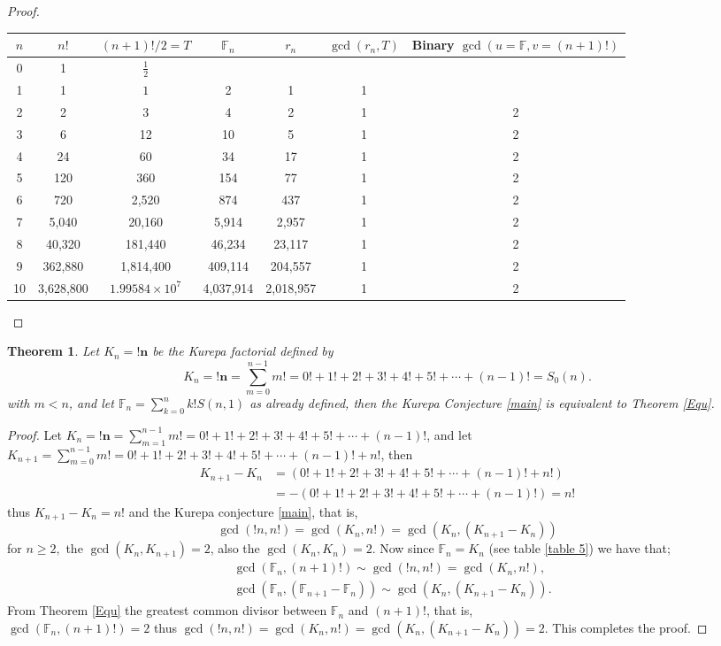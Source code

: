 \documentclass[pdflatex,sn-mathphys-num]{sn-jnl}%
\newtheorem{theorem}{Theorem}
\theoremstyle{thmstyleone}%
\theoremstyle{thmstyletwo}%
\theoremstyle{thmstylethree}%
\begin{document}
\begin{proof}
\begin{tabular}{ccccccc}
\toprule
$n$ & $n!$ & $(n+1)!/2=T$ & $\mathbb{F}_{n}$ &$r_n$ & $\gcd(r_{n},T)$& Binary $\gcd(u=\mathbb{F}, v=(n+1)!)$\\
\midrule
0 & 1 & $\frac{1}{2}$ &  &  & & \\
1 & 1 & $1$ & 2 &1 & 1& \\
2 & 2 & 3 & 4 &2 & 1&2\\
3 & 6 & 12 & 10 &5  & 1&2\\
4 & 24 & 60 & 34 &17  & 1& 2\\
5 & 120 & 360 &154  &77 & 1& 2\\
6 & 720 & 2,520 & 874 &437& 1& 2\\
7 & 5,040 & 20,160 & 5,914 &2,957& 1& 2\\
8 & 40,320 & 181,440 & 46,234 &23,117& 1& 2\\
9 & 362,880 & 1,814,400 & 409,114 &204,557& 1& 2\\
10 & 3,628,800 & $1.99584
\times10^7$ & 4,037,914 &2,018,957& 1 & 2\\
\bottomrule
\end{tabular}
\end{proof}


\begin{theorem}\label{final}
Let $K_n=\mathbf{!n}$ be the Kurepa factorial defined by
     $$K_n=\mathbf{!n}=\sum_{m=0}^{n-1}m!= 0! + 1!+ 2! + 3! + 4!+ 5!  + \cdots +(n-1)!=S_0(n).$$ with $m<n$,
and let $\mathbb{F}_n=\sum_{k=0}^n k!S(n,1)$ as already defined, 
then the Kurepa Conjecture \ref{main} is equivalent to Theorem \ref{Equ}.
\end{theorem}
\begin{proof}
Let $K_n=\mathbf{!n}=\sum_{m=1}^{n-1}m!= 0! + 1!+ 2! + 3! + 4!+ 5!  + \cdots +(n-1)!$, and let 
 $K_{n+1}=\sum_{m=0}^{n-1}m!= 0! + 1!+ 2! + 3! + 4!+ 5!  + \cdots +(n-1)!+ n!$, then
 \begin{align*}
     K_{n+1}-K_n&= (0! + 1!+ 2! + 3! + 4!+ 5!  + \cdots +(n-1)!+n!)\\
     &= -(0! + 1!+ 2! + 3! + 4!+ 5!  + \cdots +(n-1)!)=n!
 \end{align*}
thus $ K_{n+1}-K_n=n!$ and the Kurepa conjecture \ref{main}, that is,
$$\gcd(!n, n!)=\gcd(K_n, n!)=\gcd(K_n, (K_{n+1}-K_n)) $$
for $n\geq 2,$ the $\gcd(K_n, K_{n+1})=2$, also the $\gcd(K_n, K_{n})=2$. 
Now since $\mathbb{F}_n= K_n $ (see table \ref{table 5}) we have that;
\begin{align*}
    &\gcd(\mathbb{F}_{n},(n+1)!)\sim \gcd(!n, n!)=\gcd(K_n, n!),\\
    &\gcd(\mathbb{F}_{n}, (\mathbb{F}_{n+1}-\mathbb{F}_n))\sim\gcd(K_n, (K_{n+1}-K_n)). 
\end{align*}
From Theorem \ref{Equ} the greatest common divisor between $\mathbb{F}_{n}$ and $(n+1)!$, that is,\\ $\gcd(\mathbb{F}_{n},(n+1)!)=2$ thus $\gcd(!n, n!)=\gcd(K_n, n!)=\gcd(K_n, (K_{n+1}-K_n))=2.$
This completes the proof.
\end{proof}
\end{document}
